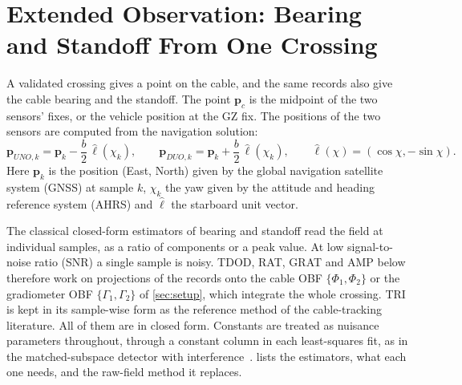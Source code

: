 \section{Extended Observation: Bearing and Standoff From One Crossing}\label{sec:observation}

A validated crossing gives a point on the cable, and the same records also give the cable bearing and the standoff. The point $\mathbf{p}_c$ is the midpoint of the two sensors' fixes, or the vehicle position at the GZ fix. The positions of the two sensors are computed from the navigation solution:
\begin{equation}
\mathbf{p}_{UNO,k} = \mathbf{p}_k - \frac{b}{2}\,\hat{\boldsymbol{\ell}}(\chi_k), \qquad \mathbf{p}_{DUO,k} = \mathbf{p}_k + \frac{b}{2}\,\hat{\boldsymbol{\ell}}(\chi_k), \qquad \hat{\boldsymbol{\ell}}(\chi) = (\cos\chi, -\sin\chi).
\label{eq:sensor_positions}
\end{equation}
Here $\mathbf{p}_k$ is the position (East, North) given by the global navigation satellite system (GNSS) at sample $k$, $\chi_k$ the yaw given by the attitude and heading reference system (AHRS) and $\hat{\boldsymbol{\ell}}$ the starboard unit vector.

The classical closed-form estimators of bearing and standoff read the field at individual samples, as a ratio of components or a peak value. At low signal-to-noise ratio (SNR) a single sample is noisy. TDOD, RAT, GRAT and AMP below therefore work on projections of the records onto the cable OBF $\{\Phi_1, \Phi_2\}$ or the gradiometer OBF $\{\Gamma_1, \Gamma_2\}$ of \cref{sec:setup}, which integrate the whole crossing. TRI is kept in its sample-wise form as the reference method of the cable-tracking literature. All of them are in closed form. Constants are treated as nuisance parameters throughout, through a constant column in each least-squares fit, as in the matched-subspace detector with interference~\cite{scharf1994matched}.  lists the estimators, what each one needs, and the raw-field method it replaces.


